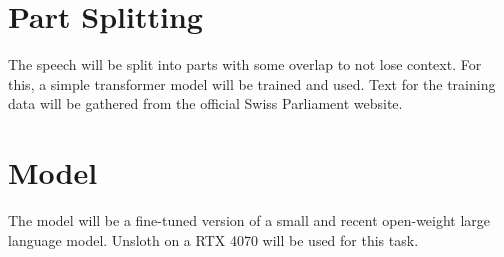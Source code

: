 \documentclass[11pt]{article}
\begin{document}
    \section{Part Splitting}\label{sec:part_splitting}
    The speech will be split into parts with some overlap to not lose context.
    For this, a simple transformer model will be trained and used.
    Text for the training data will be gathered from the official Swiss Parliament website.

    \section{Model}\label{sec:model}
    The model will be a fine-tuned version of a small and recent open-weight large language model.
    Unsloth on a RTX 4070 will be used for this task.
\end{document}
